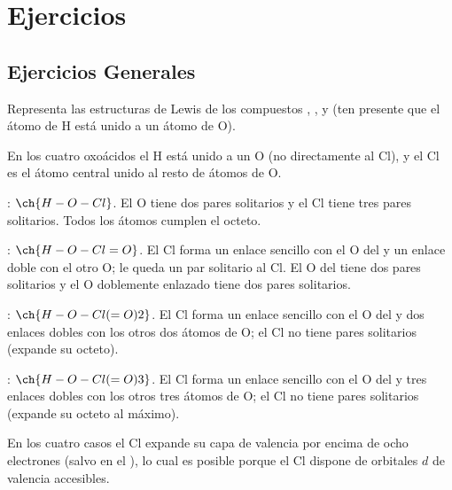 

\section{Ejercicios}\label{sec:ejercicios-UD3}

\subsection{Ejercicios Generales}\label{subsec:ejercicios-generales-UD3}

\begin{exercise}
    Representa las estructuras de Lewis de los compuestos
    , ,  y  (ten presente que el átomo
    de H está unido a un átomo de O).
    \begin{solu}
        En los cuatro oxoácidos el H está unido a un O (no directamente al Cl), y el Cl es el átomo central unido al resto de átomos de O.

        \textbf{}: \(\ch{H-O-Cl}\). El O tiene dos pares solitarios y el Cl tiene tres pares solitarios. Todos los átomos cumplen el octeto.

        \textbf{}: \(\ch{H-O-Cl=O}\). El Cl forma un enlace sencillo con el O del  y un enlace doble con el otro O; le queda un par solitario al Cl. El O del  tiene dos pares solitarios y el O doblemente enlazado tiene dos pares solitarios.

        \textbf{}: \(\ch{H-O-Cl(=O)2}\). El Cl forma un enlace sencillo con el O del  y dos enlaces dobles con los otros dos átomos de O; el Cl no tiene pares solitarios (expande su octeto).

        \textbf{}: \(\ch{H-O-Cl(=O)3}\). El Cl forma un enlace sencillo con el O del  y tres enlaces dobles con los otros tres átomos de O; el Cl no tiene pares solitarios (expande su octeto al máximo).

        En los cuatro casos el Cl expande su capa de valencia por encima de ocho electrones (salvo en el ), lo cual es posible porque el Cl dispone de orbitales \(d\) de valencia accesibles.
    \end{solu}
\end{exercise}

